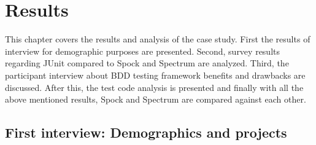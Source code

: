 \chapter{Results}
\label{chapter:results}

This chapter covers the results and analysis of the case study. First the results of interview for demographic purposes are
presented. Second, survey results regarding JUnit compared to Spock and Spectrum are analyzed. Third, the participant interview
about BDD testing framework benefits and drawbacks are discussed. After this, the test code analysis is presented and finally
with all the above mentioned results, Spock and Spectrum are compared against each other.



\section{First interview: Demographics and projects}
\label{section:demographics}

